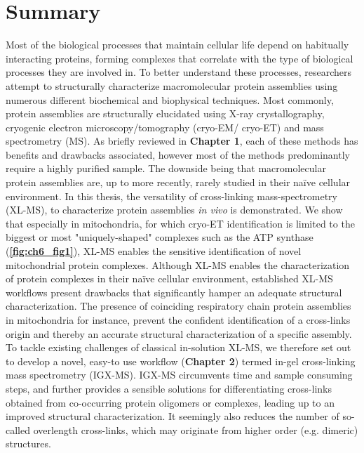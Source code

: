 \section{Summary}
Most of the biological processes that maintain cellular life depend on habitually interacting proteins, forming complexes that correlate with the type of biological processes they are involved in. To better understand these processes, researchers attempt to structurally characterize macromolecular protein assemblies using numerous different biochemical and biophysical techniques. Most commonly, protein assemblies are structurally elucidated using X-ray crystallography, cryogenic electron microscopy/tomography (cryo-EM/ cryo-ET) and mass spectrometry (MS). As briefly reviewed in \textbf{Chapter 1}, each of these methods has benefits and drawbacks associated, however most of the methods predominantly require a highly purified sample. The downside being that macromolecular protein assemblies are, up to more recently, rarely studied in their naïve cellular environment. In this thesis, the versatility of cross-linking mass-spectrometry (XL-MS), to characterize protein assemblies \emph{in vivo} is demonstrated. We show that especially in mitochondria, for which cryo-ET identification is limited to the biggest or most "uniquely-shaped" complexes \cite{RN1} such as the ATP synthase (\textbf{\autoref{fig:ch6_fig1}}), XL-MS enables the sensitive identification of novel mitochondrial protein complexes.
Although XL-MS enables the characterization of protein complexes in their naïve cellular environment, established XL-MS workflows present drawbacks that significantly hamper an adequate structural characterization. The presence of coinciding respiratory chain protein assemblies in mitochondria \cite{RN3} for instance, prevent the confident identification of a cross-links origin and thereby an accurate structural characterization of a specific assembly. To tackle existing challenges of classical in-solution XL-MS, we therefore set out to develop a novel, easy-to use workflow (\textbf{Chapter 2}) termed in-gel cross-linking mass spectrometry (IGX-MS). IGX-MS circumvents time and sample consuming steps, and further provides a sensible solutions for differentiating cross-links obtained from co-occurring protein oligomers or complexes, leading up to an improved structural characterization. It seemingly also reduces the number of so-called overlength cross-links, which may originate from higher order (e.g. dimeric) structures.
